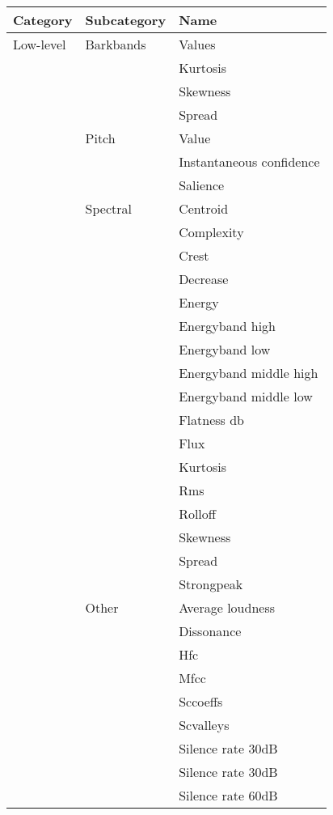 \begin{appendices}
\begin{center}
\begin{longtable}{ p{} p{} p{} }
\textbf{Category} & \textbf{Subcategory} & \textbf{Name} \\ \toprule
Low-level & Barkbands & Values\\ \cmidrule(r){3-3}
&  & Kurtosis \\ \cmidrule(r){3-3} 
&  & Skewness \\ \cmidrule(r){3-3}
&  & Spread \\ \cmidrule(r){2-3}
& Pitch & Value\\ \cmidrule(r){3-3}
& & Instantaneous confidence \\ \cmidrule(r){3-3}
& & Salience \\ \cmidrule(r){2-3}
& Spectral & Centroid \\ \cmidrule(r){3-3}
& & Complexity \\ \cmidrule(r){3-3}
& & Crest \\ \cmidrule(r){3-3}
& & Decrease \\ \cmidrule(r){3-3}
& & Energy \\ \cmidrule(r){3-3}
& & Energyband high \\ \cmidrule(r){3-3}
& & Energyband low \\ \cmidrule(r){3-3}
& & Energyband middle high \\ \cmidrule(r){3-3}
& & Energyband middle low \\ \cmidrule(r){3-3}
& & Flatness db \\ \cmidrule(r){3-3}
& & Flux \\ \cmidrule(r){3-3}
& & Kurtosis \\ \cmidrule(r){3-3}
& & Rms \\ \cmidrule(r){3-3}
& & Rolloff \\ \cmidrule(r){3-3}
& & Skewness \\ \cmidrule(r){3-3}
& & Spread \\ \cmidrule(r){3-3}
& & Strongpeak \\ \cmidrule(r){2-3}
& Other & Average loudness \\ \cmidrule(r){3-3}
& & Dissonance \\ \cmidrule(r){3-3}
& & Hfc \\ \cmidrule(r){3-3}
& & Mfcc \\ \cmidrule(r){3-3}
& & Sccoeffs \\ \cmidrule(r){3-3}
& & Scvalleys \\ \cmidrule(r){3-3}
& & Silence rate 30dB \\ \cmidrule(r){3-3}
& & Silence rate 30dB \\ \cmidrule(r){3-3}
& & Silence rate 60dB \\ \cmidrule(r){3-3}

\end{longtable}
\end{center}
\end{appendices}
